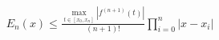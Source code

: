 \documentclass[preview]{standalone}
\begin{document}
\begin{align*}
E_n(x) \leq \frac{\max\limits_{t \in [x_0, x_n]} \left| f^{(n+1)}(t) \right|}{(n+1)!} \prod\limits_{i=0}^{n} \left| x - x_i \right|
\end{align*}
\end{document}
